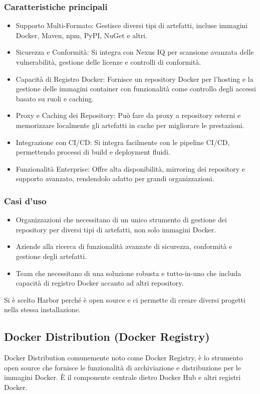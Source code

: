 \documentclass[12pt]{report}
\begin{document}
\subsubsection{Caratteristiche principali}
\begin{itemize}
  \item Supporto Multi-Formato: Gestisce diversi tipi di artefatti, incluse immagini Docker, Maven, npm, PyPI, NuGet e altri.
  \item Sicurezza e Conformità: Si integra con Nexus IQ per scansione avanzata delle vulnerabilità, gestione delle licenze e controlli di conformità.
  \item Capacità di Registro Docker: Fornisce un repository Docker per l'hosting e la gestione delle immagini container con funzionalità come controllo degli accessi basato su ruoli e caching.
  \item Proxy e Caching dei Repository: Può fare da proxy a repository esterni e memorizzare localmente gli artefatti in cache per migliorare le prestazioni.
  \item Integrazione con CI/CD: Si integra facilmente con le pipeline CI/CD, permettendo processi di build e deployment fluidi.
  \item Funzionalità Enterprise: Offre alta disponibilità, mirroring dei repository e supporto avanzato, rendendolo adatto per grandi organizzazioni.\cite{nexus}
\end{itemize}
\subsubsection{Casi d'uso}
\begin{itemize}
  \item Organizzazioni che necessitano di un unico strumento di gestione dei repository per diversi tipi di artefatti, non solo immagini Docker.
  \item Aziende alla ricerca di funzionalità avanzate di sicurezza, conformità e gestione degli artefatti.
  \item Team che necessitano di una soluzione robusta e tutto-in-uno che includa capacità di registro Docker accanto ad altri repository.
\end{itemize}

Si è scelto Harbor perché è open source e ci permette di creare diversi progetti nella stessa installazione.

\subsection{Docker Distribution (Docker Registry)}
Docker Distribution comunemente noto come Docker Registry, è lo strumento open source che fornisce le funzionalità di archiviazione e distribuzione per le immagini Docker. È il componente centrale dietro Docker Hub e altri registri Docker. \cite{distribution}
\end{document}
